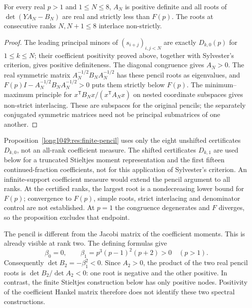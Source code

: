 \begin{proposition}
\label{long1049:res:finite-pencil}
For every real $p>1$ and $1\le N\le8$, $A_N$ is positive definite and
all roots of $\det(YA_N-B_N)$ are real and strictly less than $F(p)$.
The roots at consecutive ranks $N,N+1\le8$ interlace non-strictly.
\end{proposition}
\begin{proof}
The leading principal minors of $(s_{i+j})_{i,j<N}$ are exactly
$D_{k,0}(p)$ for $1\le k\le N$; their coefficient positivity proved above, together with
Sylvester's criterion, gives positive definiteness. The diagonal congruence gives
$A_N>0$. The real symmetric matrix $A_N^{-1/2}B_NA_N^{-1/2}$ has these
pencil roots as eigenvalues, and $F(p)I-A_N^{-1/2}B_NA_N^{-1/2}>0$ puts
them strictly below $F(p)$. The minimum--maximum principle for
$x^{\mathsf T}B_Nx/(x^{\mathsf T}A_Nx)$ on nested coordinate subspaces
gives non-strict interlacing. These are subspaces for the original
pencils; the separately conjugated symmetric matrices need not be
principal submatrices of one another.
\end{proof}
Proposition~\ref{long1049:res:finite-pencil} uses only the eight
unshifted certificates $D_{k,0}$, not an all-rank coefficient measure.
The shifted certificates $D_{k,1}$ are used below for a truncated
Stieltjes moment representation and the first fifteen continued-fraction
coefficients, not for this application of Sylvester's criterion.
An infinite-support coefficient measure would extend the pencil argument
to all ranks. At the certified ranks, the largest root is a nondecreasing
lower bound for $F(p)$; convergence to $F(p)$, simple roots, strict
interlacing and denominator control are not established. At $p=1$ the
congruence degenerates and $F$ diverges, so the proposition excludes that
endpoint.

The pencil is different from the Jacobi matrix of the coefficient
moments. This is already visible at rank two. The defining formulas give
\[
 \beta_0=0,\qquad \beta_1=p^3(p-1)^2(p+2)>0\quad(p>1).
\]
Consequently $\det B_2=-\beta_1^2<0$. Since $A_2>0$, the product of the
two real pencil roots is $\det B_2/\det A_2<0$: one root is negative
and the other positive. In contrast, the finite Stieltjes construction
below has only positive nodes. Positivity of the coefficient Hankel
matrix therefore does not identify these two spectral constructions.

